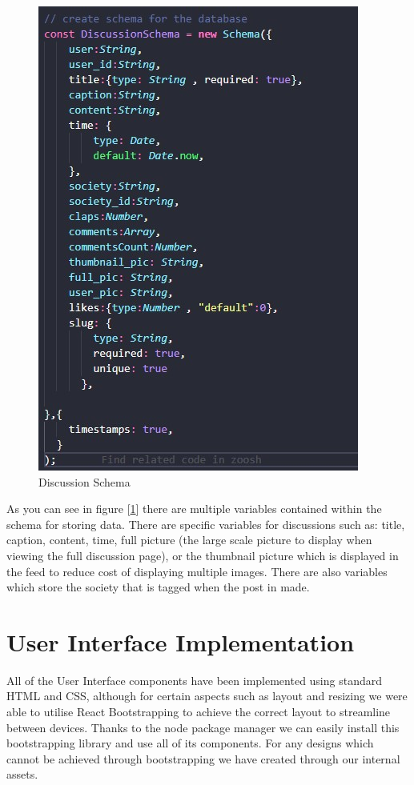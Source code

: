 \begin{figure}[H]
  \centering
  \includegraphics[scale=0.7]{img/discussion_schema.jpg}
  \caption{Discussion Schema}
  \label{fig:Discussion Schema}
\end{figure}

As you can see in figure [\ref{fig:Discussion Schema}] there are multiple variables contained within the schema for storing data. There are specific variables for discussions such as: title, caption, content, time, full picture (the large scale picture to display when viewing the full discussion page), or the thumbnail picture which is displayed in the feed to reduce cost of displaying multiple images. There are also variables which store the society that is tagged when the post in made.

\newpage

\section{User Interface Implementation}
All of the User Interface components have been implemented using standard HTML and CSS, although for certain aspects such as layout and resizing we were able to utilise React Bootstrapping \cite{react-bootstrap} to achieve the correct layout to streamline between devices. Thanks to the node package manager we can easily install this bootstrapping library and use all of its components. For any designs which cannot be achieved through bootstrapping we have created through our internal assets.

